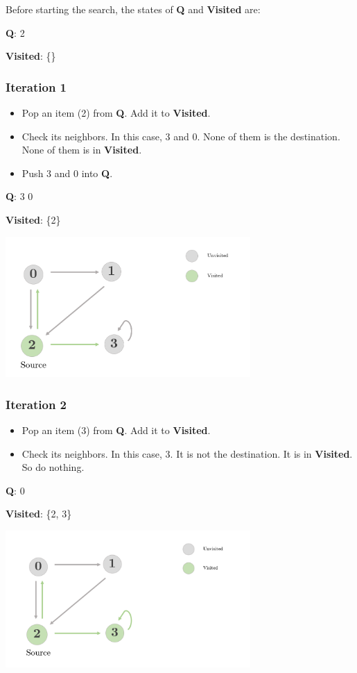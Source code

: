 \documentclass[12pt]{article}
\begin{document}
Before starting the search, the states of \textbf{Q} and \textbf{Visited} are:

\textbf{Q}: 2

\textbf{Visited}: \{\}

\subsubsection*{Iteration 1}
\begin{itemize}
  \item Pop an item (2) from \textbf{Q}. Add it to \textbf{Visited}.
  \item Check its neighbors. In this case, 3 and 0. None of them is the destination. None of them is in \textbf{Visited}.
  \item Push 3 and 0 into \textbf{Q}.
\end{itemize}

\textbf{Q}: 3 0

\textbf{Visited}: \{2\}

\begin{center}
    \includegraphics[width=0.7\textwidth]{1.png}
\end{center}

\subsubsection*{Iteration 2}
\begin{itemize}
  \item Pop an item (3) from \textbf{Q}. Add it to \textbf{Visited}.
  \item Check its neighbors. In this case, 3. It is not the destination. It is in \textbf{Visited}. So do nothing.
\end{itemize}

\textbf{Q}: 0

\textbf{Visited}: \{2, 3\}

\begin{center}
    \includegraphics[width=0.7\textwidth]{2.png}
\end{center}
\end{document}
